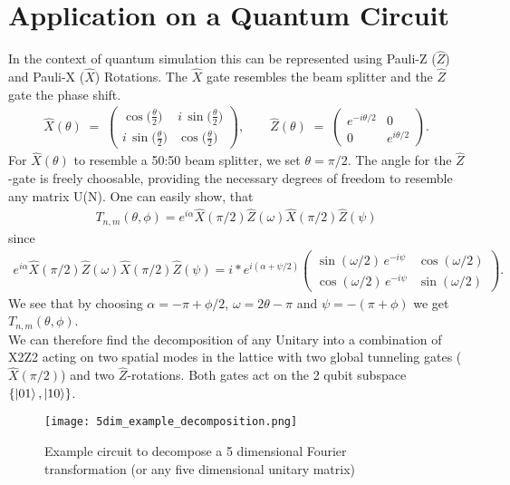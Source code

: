 \documentclass[12pt,twoside]{report}  %
\begin{document}
\section{Application on a Quantum Circuit}
In the context of quantum simulation this can be represented using Pauli-Z ($\hat{Z}$) and Pauli-X ($\hat{X}$) Rotations. The $\hat{X}$ gate resembles the beam splitter and the $\hat{Z}$ gate the phase shift. 
\begin{align}
    \hat{X}(\theta) \;=\; \begin{pmatrix}
\cos\!\bigl(\tfrac{\theta}{2}\bigr) & i\,\sin\!\bigl(\tfrac{\theta}{2}\bigr)
\\[6pt]
i\,\sin\!\bigl(\tfrac{\theta}{2}\bigr) & \cos\!\bigl(\tfrac{\theta}{2}\bigr)
\end{pmatrix},
\qquad
\hat{Z}(\theta) \;=\; \begin{pmatrix}
e^{-i\theta/2} & 0
\\[6pt]
0 & e^{i\theta/2}
\end{pmatrix}.
\end{align}
For $\hat{X}(\theta)$ to resemble a 50:50 beam splitter, we set $\theta=\pi/2$. The angle for the $\hat{Z}$-gate is freely choosable, providing the necessary degrees of freedom to resemble any matrix U(N). One can easily show, that
\begin{align}
    T_{n,m}(\theta,\phi) = e^{i\alpha}\hat{X}(\pi/2)\hat{Z}(\omega)\hat{X}(\pi/2)\hat{Z}(\psi)
\end{align}
since
\begin{align}
    e^{i\alpha}\hat{X}(\pi/2)\hat{Z}(\omega)\hat{X}(\pi/2)\hat{Z}(\psi)= i*e^{i(\alpha +\psi/2)}\begin{pmatrix}
\sin(\omega/2)\,e^{-i\psi} & \cos(\omega/2)\\[2mm]
\cos(\omega/2)\,e^{-i\psi} & \sin(\omega/2)
\end{pmatrix}.
\end{align}
We see that by choosing $\alpha= -\pi + \phi/2$, $\omega= 2\theta - \pi$ and $\psi = -(\pi + \phi)$ we get $T_{n,m}(\theta,\phi)$. \\
We can therefore find the decomposition of any Unitary into a combination of X2Z2 acting on two spatial modes in the lattice with two global tunneling gates ($\hat{X}(\pi/2)$) and two $\hat{Z}$-rotations. Both gates act on the 2 qubit subspace $\{\ket{01},\ket{10}\}$.
\begin{figure}[t]
    \centering
    \texttt{[image: 5dim\_example\_decomposition.png]}
    \caption{Example circuit to decompose a 5 dimensional Fourier transformation (or any five dimensional unitary matrix)}
    \label{decompositioncircuit}
\end{figure}
\end{document}

